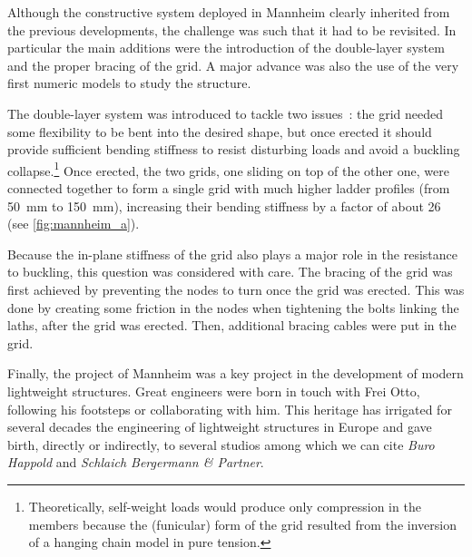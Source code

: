 Although the constructive system deployed in Mannheim clearly inherited from the previous developments, the challenge was such that it had to be revisited. In particular the main additions were the introduction of the double-layer system and the proper bracing of the grid. A major advance was also the use of the very first numeric models to study the structure.

The double-layer system was introduced to tackle two issues~: the grid needed some flexibility to be bent into the desired shape, but once erected it should provide sufficient bending stiffness to resist disturbing loads and avoid a buckling collapse.\footnote{Theoretically, self-weight loads would produce only compression in the members because the (funicular) form of the grid resulted from the inversion of a hanging chain model in pure tension.} Once erected, the two grids, one sliding on top of the other one, were connected together to form a single grid with much higher ladder profiles (from \SI{50}{mm} to \SI{150}{mm}), increasing their bending stiffness by a factor of about 26 (see \cref{fig:mannheim_a}).


Because the in-plane stiffness of the grid also plays a major role in the resistance to buckling, this question was considered with care. The bracing of the grid was first achieved by preventing the nodes to turn once the grid was erected. This was done by creating some friction in the nodes when tightening the bolts linking the laths, after the grid was erected. Then, additional bracing cables were put in the grid.

Finally, the project of Mannheim was a key project in the development of modern lightweight structures. Great engineers were born in touch with Frei Otto, following his footsteps or collaborating with him. This heritage has irrigated for several decades the engineering of lightweight structures in Europe and gave birth, directly or indirectly, to several studios among which we can cite \emph{Buro Happold} and \emph{Schlaich Bergermann \& Partner}.


